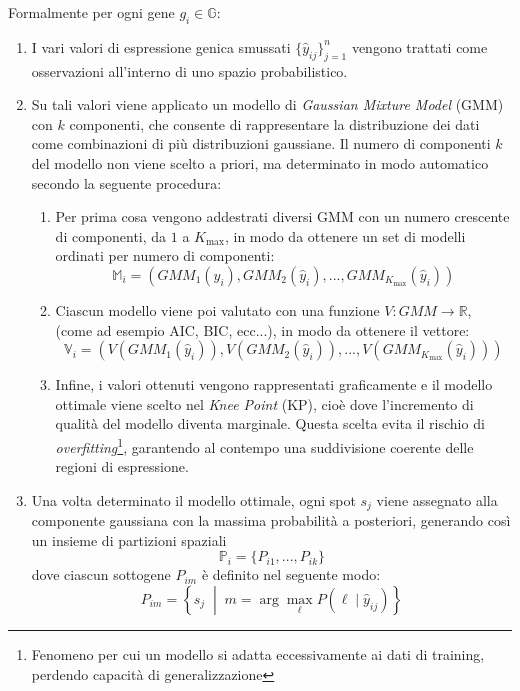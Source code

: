 Formalmente per ogni gene $g_i \in \mathbb{G}$:
\begin{enumerate}
	\item I vari valori di espressione genica smussati $\{\hat{y}_{ij}\}_{j=1}^n$ vengono trattati 
		come osservazioni all'interno di uno spazio probabilistico.
	\item Su tali valori viene applicato un modello di \textit{Gaussian Mixture Model} (GMM) con $k$ componenti, 
		che consente di rappresentare la distribuzione dei dati come combinazioni di più distribuzioni gaussiane.
		Il numero di componenti $k$ del modello non viene scelto a priori, ma determinato in modo automatico secondo la seguente procedura:
		\begin{enumerate}
			\item Per prima cosa vengono addestrati diversi GMM con un numero crescente di componenti, da $1$ a $K_{\text{max}}$, in modo da ottenere 
				un set di modelli ordinati per numero di componenti:
				\begin{equation}
					\label{eq:GMMPrimoStep}
					\mathbb{M}_i = (GMM_1(\hat{y}_i), GMM_2(\hat{y}_i), ..., GMM_{K_{\text{max}}}(\hat{y}_i))
				\end{equation}
			\item Ciascun modello viene poi valutato con una funzione $V: GMM \rightarrow \mathbb{R}$, (come ad esempio AIC, BIC, ecc...),
				in modo da ottenere il vettore:
				\begin{equation}
					\label{eq:GMMSecondoStep}
					\mathbb{V}_i = (V(GMM_1(\hat{y}_i)), V(GMM_2(\hat{y}_i)), ..., V(GMM_{K_{\text{max}}}(\hat{y}_i)))
				\end{equation}
			\item Infine, i valori ottenuti vengono rappresentati graficamente e il modello ottimale viene scelto nel \textit{Knee Point} (KP), cioè dove l'incremento di qualità del modello diventa marginale.
				Questa scelta evita il rischio di \textit{overfitting}\footnote{Fenomeno per cui un modello si adatta eccessivamente ai dati di training, perdendo capacità di generalizzazione}, garantendo al contempo una suddivisione coerente delle regioni di espressione.
		\end{enumerate}
	\item Una volta determinato il modello ottimale, ogni spot $s_j$ viene assegnato alla componente gaussiana con la massima probabilità a posteriori, generando così un insieme di partizioni spaziali
		\begin{equation}
			\mathbb{P}_i = \{P_{i1}, ..., P_{ik}\}
		\end{equation}
		dove ciascun sottogene $P_{im}$ è definito nel seguente modo:
		\begin{equation}
			P_{im} = \left\{ s_j \;\middle|\; m = \arg\max_{\ell} P(\ell \mid \hat{y}_{ij}) \right\}
		\end{equation}
\end{enumerate}
